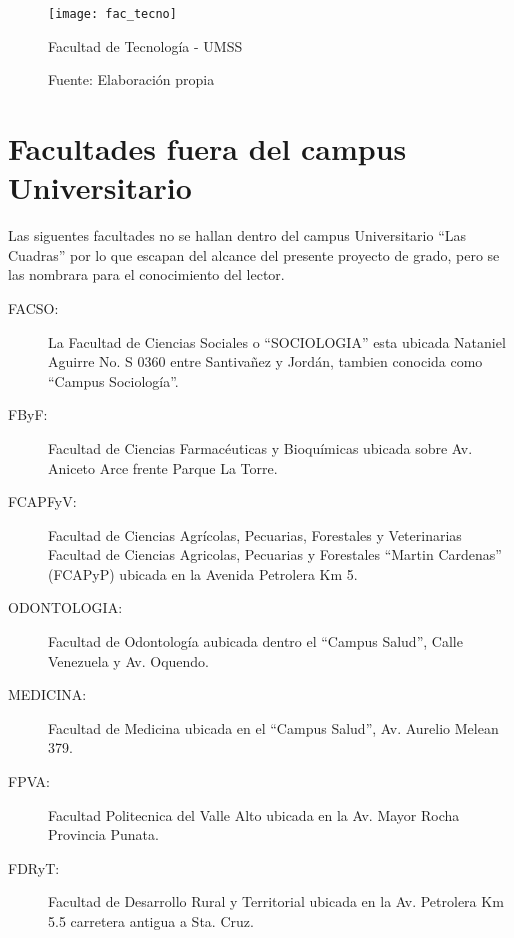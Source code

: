 \begin{figure}[H]
 \begin{center}
   \texttt{[image: fac\_tecno]}
   \caption{Facultad de Tecnología - UMSS}
   \label{fig:fac_tecno}
   \caption*{Fuente: Elaboración propia}
 \end{center}
\end{figure}




\section{Facultades fuera del campus Universitario}
\label{sec:Facultades fuera del campus Universitario}

Las siguentes facultades no se hallan dentro del campus Universitario ``Las Cuadras'' por lo que escapan del alcance del presente proyecto de grado, pero se las nombrara para el conocimiento del lector.

\begin{description}
  \item[FACSO:] La Facultad de Ciencias Sociales o ``SOCIOLOGIA'' esta ubicada Nataniel Aguirre No. S 0360 entre Santivañez y Jordán, tambien conocida como ``Campus Sociología''.
  \item[FByF:] Facultad de Ciencias Farmacéuticas y Bioquímicas ubicada sobre Av. Aniceto Arce frente Parque La Torre.
  \item[FCAPFyV:] Facultad de Ciencias Agrícolas, Pecuarias, Forestales y Veterinarias
  Facultad de Ciencias Agricolas, Pecuarias y Forestales ``Martin Cardenas'' (FCAPyP) ubicada en la Avenida Petrolera Km 5.
  \item[ODONTOLOGIA:] Facultad de Odontología aubicada dentro el ``Campus Salud'', Calle Venezuela y Av. Oquendo.
  \item[MEDICINA:] Facultad de Medicina ubicada en el ``Campus Salud'', Av. Aurelio Melean 379.
  \item[FPVA:] Facultad Politecnica del Valle Alto ubicada en la Av. Mayor Rocha Provincia Punata.
  \item[FDRyT:] Facultad de Desarrollo Rural y Territorial  ubicada en la Av. Petrolera Km 5.5 carretera antigua a Sta. Cruz.

\end{description}


